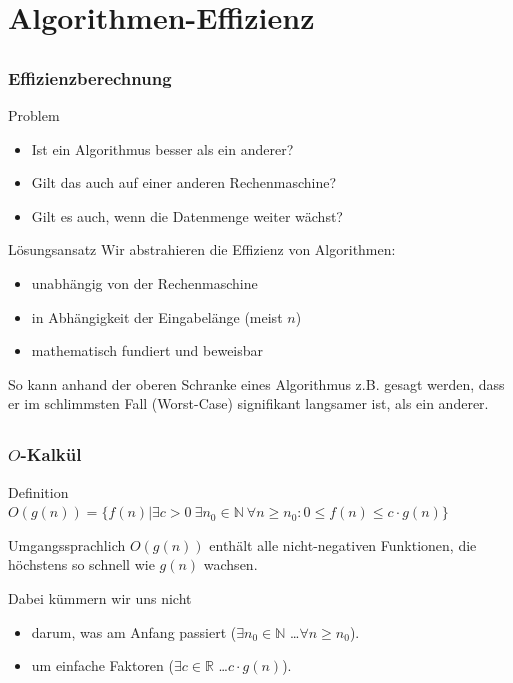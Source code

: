 
\section[Effizienz]{Algorithmen-Effizienz}
\subsection*{}
\begin{frame}
  \frametitle{Effizienzberechnung}

  \begin{block}{Problem}
    \begin{itemize}
      \item Ist ein Algorithmus besser als ein anderer?
      \item Gilt das auch auf einer anderen Rechenmaschine?
      \item Gilt es auch, wenn die Datenmenge weiter wächst?
    \end{itemize}
  \end{block}
\pause
  \begin{block}{Lösungsansatz}
    Wir abstrahieren die Effizienz von Algorithmen:
    \begin{itemize}
      \item unabhängig von der Rechenmaschine
      \item in Abhängigkeit der Eingabelänge (meist $n$)
      \item mathematisch fundiert und beweisbar
    \end{itemize}
    So kann anhand der oberen Schranke
				eines Algorithmus z.B. gesagt werden, dass er im schlimmsten Fall (Worst-Case) signifikant langsamer ist,
				als ein anderer.
  \end{block}
\end{frame}


\subsection*{}
\begin{frame}
  \frametitle{$O$-Kalkül}
    \begin{block}{Definition}
          $O(g(n))=\{f(n)| \exists c > 0 \ \exists n_{0} \in \mathbb{N}\ \forall n \ge n_{0}: 0 \le f(n) \le c\cdot g(n)\}$
    \end{block}

    \begin{block}{Umgangssprachlich}
        $O(g(n))$ enthält alle nicht-negativen Funktionen, die höchstens so schnell wie $g(n)$ wachsen.

        Dabei kümmern wir uns nicht

  \begin{itemize}
    \item darum, was am Anfang passiert ($\exists n_0\in\mathbb{N}$ \ldots $\forall n\ge n_0$).
    \item um einfache Faktoren ($\exists c\in\mathbb{R}$ \ldots $c\cdot g(n)$).
  \end{itemize}
  \end{block}
\end{frame}

